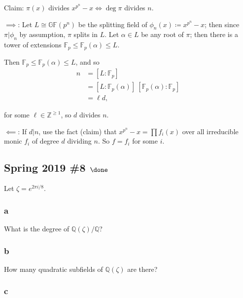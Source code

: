 \begin{solution}
Claim: \(\pi(x)\) divides \(x^{p^n}-x \iff \deg \pi\) divides \(n\).

\(\implies\): Let \(L \cong {\mathbb{GF}}(p^n)\) be the splitting field
of \(\phi_n(x) \coloneqq x^{p^n}-x\); then since
\(\pi \mathrel{\Big|}\phi_n\) by assumption, \(\pi\) splits in \(L\).
Let \(\alpha \in L\) be any root of \(\pi\); then there is a tower of
extensions \({\mathbb{F}}_p \leq {\mathbb{F}}_p(\alpha) \leq L\).

Then \({\mathbb{F}}_p \leq {\mathbb{F}}_p(\alpha) \leq L\), and so
\begin{align*}
n &= [L: {\mathbb{F}}_p] \\
&= [L: {\mathbb{F}}_p(\alpha)]~[{\mathbb{F}}_p(\alpha): {\mathbb{F}}_p] \\
&= \ell d
,\end{align*}

for some \(\ell \in {\mathbb{Z}}^{\geq 1}\), so \(d\) divides \(n\).

\(\impliedby\): If \(d\mathrel{\Big|}n\), use the fact (claim) that
\(x^{p^n} - x = \prod f_i(x)\) over all irreducible monic \(f_i\) of
degree \(d\) dividing \(n\). So \(f = f_i\) for some \(i\).

\end{solution}

\hypertarget{spring-2019-8-done}{%
\subsection{\texorpdfstring{Spring 2019 \#8
\(\done\)}{Spring 2019 \#8 \textbackslash done}}\label{spring-2019-8-done}}

Let \(\zeta = e^{2\pi i/8}\).

\hypertarget{a-55}{%
\subsubsection{a}\label{a-55}}

What is the degree of \({\mathbb{Q}}(\zeta)/{\mathbb{Q}}\)?

\hypertarget{b-45}{%
\subsubsection{b}\label{b-45}}

How many quadratic subfields of \({\mathbb{Q}}(\zeta)\) are there?

\hypertarget{c-29}{%
\subsubsection{c}\label{c-29}}

